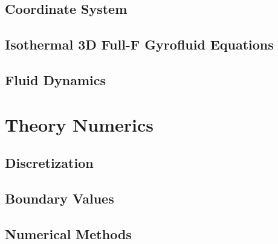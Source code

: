 \documentclass[12pt,oneside,bibtotoc,liststotoc]{scrbook}
\begin{document}
\section{Coordinate System}

\section{Isothermal 3D Full-F Gyrofluid Equations}
\label{sec:isothermalequations}



\section{Fluid Dynamics}
\label{sec:fluid-dynamics}



\chapter{Theory Numerics}
\section{Discretization}

\section{Boundary Values}

\section{Numerical Methods}

\end{document}

